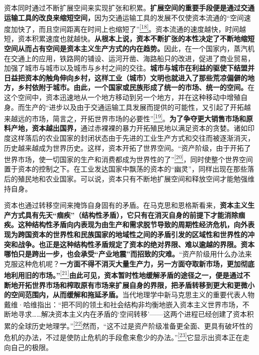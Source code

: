 \documentclass[UTF8, fontset = sourcesans, a4paper, oneside, zihao =
-4, scheme=chinese, no-math, space=true]{ctexbook}
\begin{document}
资本同时通过不断扩展空间来实现扩张和积累。\textbf{扩展空间的重要手段便是通过交通运输工具的改良来缩短空间，}因为交通运输工具的发展不仅使资本流通的``空间速度加快了，而且空间距离在时间上也缩短了''\protect\hypertarget{part0010_split_002.htmlux5cux23w18}{}{}\protect\hyperlink{part0010_split_002.htmlux5cux23m18}{\textsuperscript{{[}18{]}}}。资本流通的速度越快，时间越短，资本积累速度也就越快。\textbf{从根本上说，资本不断扩张的本性决定了不断地缩短空间从而占有空间是资本主义生产方式的内在趋势。}因此，在一个国家内，蒸汽机在交通上的应用，铁路网的铺设、运河开凿、海路船只的改进，促进了商业贸易，加强了城市与城市以及城市与乡村之间的交往。\textbf{城市与城市在利益的驱使下结盟并日益把资本的触角伸向乡村，这样工业（城市）文明也就进入了那些荒凉偏僻的地方，乡村依附于城市。由此，一个国家或民族形成了统一的市场、统一的空间。}在这个空间中，资本迅速地从一个地方移动到另一个地方，并在这种移动中增殖自身。而生产的``进步以及由于交通运输工具发展而提供的可能性，又引起了开拓越来越远的市场，简言之，开拓世界市场的必要性''\protect\hypertarget{part0010_split_002.htmlux5cux23w19}{}{}\protect\hyperlink{part0010_split_002.htmlux5cux23m19}{\textsuperscript{{[}19{]}}}。\textbf{为了争夺更大销售市场和原料产地，资本越出国界，}通过赤裸裸的暴力开拓殖民地以满足资本的贪婪。诸如印度这样落后的农业国家的封闭状态由于先进的工业生产方式和交往而被逐渐消灭，历史越来越成为世界历史。这样，资本开拓了世界空间。``资产阶级，由于开拓了世界市场，使一切国家的生产和消费都成为世界性的了''\protect\hypertarget{part0010_split_002.htmlux5cux23w20}{}{}\protect\hyperlink{part0010_split_002.htmlux5cux23m20}{\textsuperscript{{[}20{]}}}，同时使整个世界空间置于资本的控制之下。在工业发达国家中飘荡的资本的``幽灵''，同样出现在那些落后的殖民地和农业国家。可以说，资本只有不断地扩展空间和释放空间才能勉强维持自身。

资本也通过转移空间来掩饰自身固有的矛盾。在马克思和恩格斯看来，\textbf{资本主义生产方式具有先天``痼疾''（结构性矛盾），它只有在消灭自身的前提下才能消除痼疾。这种结构性矛盾向内表现为由生产和需求脱节导致的周期性经济危机，向外表现为跨国资本的世界性和民族国家的地域性之间的矛盾引发的区域性和世界性的冲突和战争。也正是这种结构性矛盾规定了资本的绝对界限、难以逾越的界限。资本哪怕只是跨出一步，也会承受``产业地震''而招致的灾难。}``资产阶级用什么办法来克服这种危机呢？\textbf{一方面不得不消灭大量生产力，另一方面夺取新市场，更加彻底地利用旧的市场。''}\protect\hypertarget{part0010_split_002.htmlux5cux23w21}{}{}\protect\hyperlink{part0010_split_002.htmlux5cux23m21}{\textsuperscript{{[}21{]}}}\textbf{由此可见，资本暂时性地缓解矛盾的途径之一，便是通过不断地开拓世界市场和榨取原有市场来扩展自身的界限，把矛盾转移到更大和更微小的空间范围内，从而缓解和拖延矛盾。}当代地理学中新马克思主义的重要代表人物戴维·哈维指出：``把不同的领土和社会结构非均衡地嵌入资本主义世界市场，不断地寻求……解决资本主义内在矛盾的`空间转移'------这两个进程已经创建了资本积累的全球历史地理学。''\protect\hypertarget{part0010_split_002.htmlux5cux23w22}{}{}\protect\hyperlink{part0010_split_002.htmlux5cux23m22}{\textsuperscript{{[}22{]}}}然而，``这不过是资产阶级准备更全面、更具有破坏性的危机的办法，不过是使防止危机的手段愈来愈少的办法。''\protect\hypertarget{part0010_split_002.htmlux5cux23w23}{}{}\protect\hyperlink{part0010_split_002.htmlux5cux23m23}{\textsuperscript{{[}23{]}}}它显示出资本正在走向自己的极限。
\end{document}
